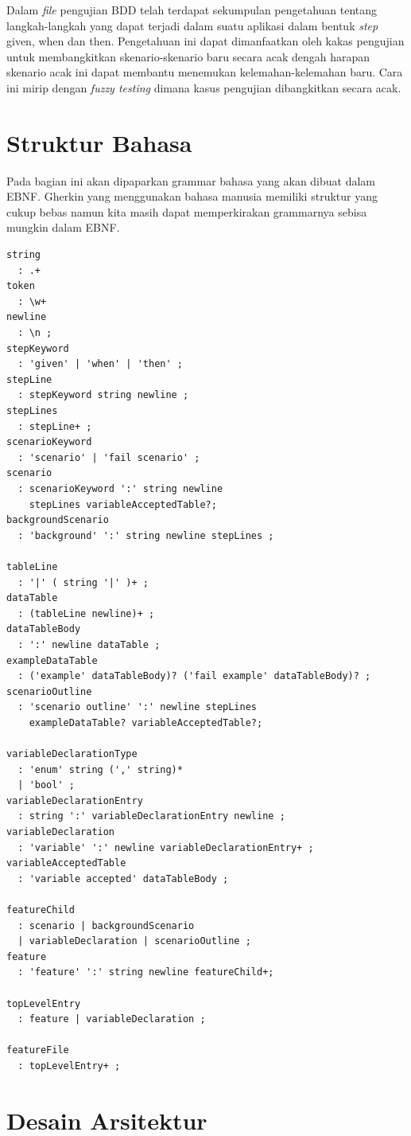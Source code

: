 Dalam \emph{file} pengujian BDD telah terdapat sekumpulan pengetahuan tentang langkah-langkah
yang dapat terjadi dalam suatu aplikasi dalam bentuk \emph{step} given, when dan then.
Pengetahuan ini dapat dimanfaatkan oleh kakas pengujian untuk membangkitkan skenario-skenario
baru secara acak dengah harapan skenario acak ini dapat membantu menemukan kelemahan-kelemahan baru.
Cara ini mirip dengan \emph{fuzzy testing} dimana kasus pengujian dibangkitkan secara acak.


\section{Struktur Bahasa}

Pada bagian ini akan dipaparkan grammar bahasa yang akan dibuat dalam EBNF. Gherkin yang menggunakan bahasa
manusia memiliki struktur yang cukup bebas namun kita masih dapat memperkirakan grammarnya sebisa mungkin
dalam EBNF.

\begin{lstlisting}[language=ebnf]
string
  : .+
token
  : \w+
newline
  : \n ;
stepKeyword
  : 'given' | 'when' | 'then' ;
stepLine
  : stepKeyword string newline ;
stepLines
  : stepLine+ ;
scenarioKeyword
  : 'scenario' | 'fail scenario' ;
scenario
  : scenarioKeyword ':' string newline
    stepLines variableAcceptedTable?;
backgroundScenario
  : 'background' ':' string newline stepLines ;

tableLine
  : '|' ( string '|' )+ ;
dataTable
  : (tableLine newline)+ ;
dataTableBody
  : ':' newline dataTable ;
exampleDataTable
  : ('example' dataTableBody)? ('fail example' dataTableBody)? ;
scenarioOutline
  : 'scenario outline' ':' newline stepLines
    exampleDataTable? variableAcceptedTable?;

variableDeclarationType
  : 'enum' string (',' string)*
  | 'bool' ;
variableDeclarationEntry
  : string ':' variableDeclarationEntry newline ;
variableDeclaration
  : 'variable' ':' newline variableDeclarationEntry+ ;
variableAcceptedTable
  : 'variable accepted' dataTableBody ;

featureChild
  : scenario | backgroundScenario
  | variableDeclaration | scenarioOutline ;
feature
  : 'feature' ':' string newline featureChild+;

topLevelEntry
  : feature | variableDeclaration ;

featureFile
  : topLevelEntry+ ;
\end{lstlisting}


\section{Desain Arsitektur}

